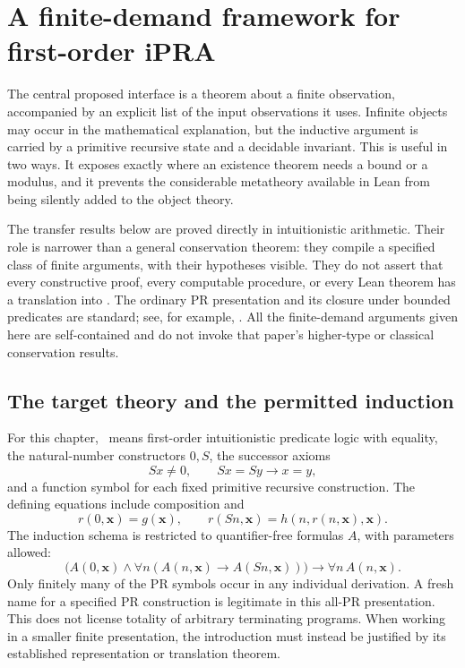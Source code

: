 \section{A finite-demand framework for first-order iPRA}
\label{sec:finite-demand-framework}

The central proposed interface is a theorem about a finite observation, accompanied
by an explicit list of the input observations it uses.  Infinite objects may occur
in the mathematical explanation, but the inductive argument is carried by a
primitive recursive state and a decidable invariant.  This is useful in two
ways.  It exposes exactly where an existence theorem needs a bound or a modulus,
and it prevents the considerable metatheory available in Lean from being
silently added to the object theory.

The transfer results below are proved directly in intuitionistic arithmetic.
Their role is narrower than a general conservation theorem: they compile a
specified class of finite arguments, with their hypotheses visible.  They do
not assert that every constructive proof, every computable procedure, or every
Lean theorem has a translation into \ipra.  The ordinary PR presentation and its
closure under bounded predicates are standard; see, for example,
\cite[Section~2]{Avigad2002}.  All the finite-demand arguments given here are
self-contained and do not invoke that paper's higher-type or classical
conservation results.

\subsection{The target theory and the permitted induction}

For this chapter, \ipra\ means first-order intuitionistic predicate logic with
equality, the natural-number constructors $0,S$, the successor axioms
\[
 Sx\ne0,\qquad Sx=Sy\longrightarrow x=y,
\]
and a function symbol for each fixed primitive recursive construction.  The
defining equations include composition and
\[
 r(0,\boldsymbol x)=g(\boldsymbol x),\qquad
 r(Sn,\boldsymbol x)=h(n,r(n,\boldsymbol x),\boldsymbol x).
\]
The induction schema is restricted to quantifier-free formulas $A$, with
parameters allowed:
\[
 \bigl(A(0,\boldsymbol x)\land
       \forall n(A(n,\boldsymbol x)\to A(Sn,\boldsymbol x))\bigr)
       \longrightarrow \forall n\,A(n,\boldsymbol x).
\]
Only finitely many of the PR symbols occur in any individual derivation.
A fresh name for a specified PR construction is legitimate in this all-PR
presentation.  This does not license totality of arbitrary terminating
programs.  When working in a smaller finite presentation, the introduction
must instead be justified by its established representation or translation
theorem.

